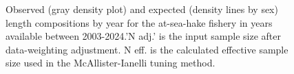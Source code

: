 \documentclass[
]{scrartcl}
\begin{document}
\begin{figure}[H]


\caption{\label{fig-len-fit-ashop}Observed (gray density plot) and
expected (density lines by sex) length compositions by year for the
at-sea-hake fishery in years available between 2003-2024.'N adj.' is the
input sample size after data-weighting adjustment. N eff. is the
calculated effective sample size used in the McAllister-Ianelli tuning
method.}

\end{figure}%
\end{document}
